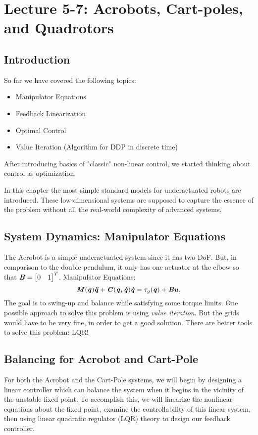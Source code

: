 \chapter{Lecture 5-7: Acrobots, Cart-poles, and Quadrotors}
\section{Introduction}
So far we have covered the following topics:
\begin{itemize}
\item Manipulator Equations
\item Feedback Linearization
\item Optimal Control
\item Value Iteration (Algorithm for DDP in discrete time)
\end{itemize}
After introducing basics of "classic" non-linear control, we started thinking about control as optimization.

In this chapter the most simple standard models for underactuated robots are introduced. These low-dimensional systems are supposed to capture the essence of the problem without all the real-world complexity of advanced systems. 

\section{System Dynamics: Manipulator Equations}
The Acrobot is a simple underactuated system since it has two DoF. But, in comparison to the double pendulum, it only has one actuator at the elbow so that 
$\bm{\mathit{B}}=\begin{bmatrix} 0 & 1 \end{bmatrix}^T $.
Manipulator Equations: 
\begin{equation*}
\bm{\mathit{M}}(\bm{\mathit{q}})\bm{\mathit{\ddot{q}}}+\bm{\mathit{C}}(\bm{\mathit{q,\dot{q}}})\bm{\mathit{\dot{q}}}=\tau_g(\bm{\mathit{q}})+\bm{\mathit{Bu}}.
\end{equation*}
The goal is to swing-up and balance while satisfying some torque limits. One possible approach to solve this problem is using \textit{value iteration}. But the grids would have to be very fine, in order to get a good solution. There are better tools to solve this problem: LQR!


\section{Balancing for Acrobot and Cart-Pole}
For both the Acrobot and the Cart-Pole systems, we will begin by designing a linear controller which can balance the system when it begins in the vicinity of the unstable fixed point. To accomplish this, we will linearize the nonlinear equations about the fixed point, examine the controllability of this linear system, then using linear quadratic regulator (LQR) theory to design our feedback controller.

